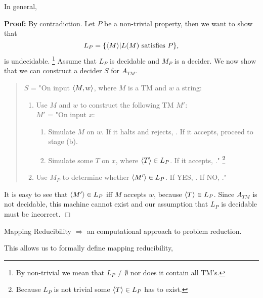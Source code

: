\documentclass[a4paper,blends,pdf,colorBG,slideColor]{prosper}
\begin{document}
{\small
In general,


{\bf Proof:} By contradiction. Let $P$ be a non-trivial property, then we want to show that
\[
L_P = \{ \langle {M} \rangle | \mbox{$L(M)$ satisfies $P$}\},
\]
is undecidable. \footnote{By non-trivial we mean that $L_P \ne \emptyset$ nor does it contain all TM's.}
Assume that $L_P$ is decidable and $M_P$ is a decider.
We now show that we can construct a decider $S$ for $A_{TM}$.

\begin{quote}
$S$ = "On input $\langle {M,w} \rangle$, where $M$ is a TM and $w$ a string:
\begin{enumerate}
\item Use $M$ and $w$ to construct the following TM $M'$:\\
$M'$ = "On input $x$:
\begin{enumerate}
\item Simulate $M$ on $w$.  If it halts and rejects, \reject. If it accepts, proceed
to stage (b).
\item \label{next} Simulate some $T$ on $x$, where $\langle {T} \rangle\in L_P$.  If it accepts, \accept." \footnote{Because $L_P$
is not trivial some $\langle {T} \rangle \in L_P$ has to exist.}
\end{enumerate}
\item Use $M_P$ to determine whether $\langle {M'} \rangle \in L_P$.
If YES, \accept. If NO, \reject."
\end{enumerate}
\end{quote}

It is easy to see that $\langle {M'} \rangle\in L_P$ iff $M$ accepts $w$, because $\langle {T} \rangle\in L_P$.
Since $A_{TM}$ is not decidable, this machine cannot exist and our
assumption that $L_P$ is decidable must be incorrect. $\Box$


}
\es


Mapping Reducibility $\Rightarrow$ an computational approach to problem reduction.


This allows us to formally define mapping reducibility,

\end{document}
